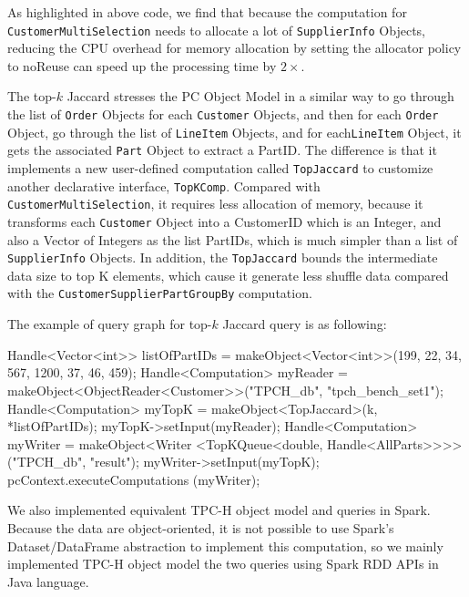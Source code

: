 As highlighted in above code,  we find
that because the computation for \texttt{CustomerMultiSelection} needs
to allocate a lot of \texttt{SupplierInfo} Objects, reducing the CPU
overhead for memory allocation by setting the allocator policy to
noReuse can speed up the processing time by $2\times$.

\vspace{5pt}
The top-$k$ Jaccard stresses the PC Object Model in a similar way to
go through the list of \texttt{Order} Objects for each
\texttt{Customer} Objects, and then for each \texttt{Order} Object, go
through the list of \texttt{LineItem} Objects, and for
each\texttt{LineItem} Object, it gets the associated \texttt{Part}
Object to extract a PartID. 
The difference is that it implements a new user-defined computation
called \texttt{TopJaccard} to customize another declarative interface,
\texttt{TopKComp}. Compared with \texttt{CustomerMultiSelection}, it
requires less allocation of memory, because it transforms each
\texttt{Customer} Object into a CustomerID which is an Integer, and
also a Vector of Integers as the list PartIDs, which is much simpler
than a list of  \texttt{SupplierInfo} Objects. In addition, the
\texttt{TopJaccard} bounds the intermediate data size to top K
elements, which cause it generate less shuffle data compared with the
\texttt{CustomerSupplierPartGroupBy} computation.

\vspace{5pt}
The example of query graph for top-$k$ Jaccard query is as following:

\begin{code}
    Handle<Vector<int>> listOfPartIDs = 
          makeObject<Vector<int>>(199, 22, 34, 567, 1200, 37, 46, 459);
    Handle<Computation> myReader = 
         makeObject<ObjectReader<Customer>>("TPCH_db", "tpch_bench_set1");
    Handle<Computation> myTopK = makeObject<TopJaccard>(k, *listOfPartIDs);
    myTopK->setInput(myReader);
    Handle<Computation> myWriter = makeObject<Writer
          <TopKQueue<double, Handle<AllParts>>>>("TPCH_db", "result");
    myWriter->setInput(myTopK);
    pcContext.executeComputations (myWriter);
\end{code}

We also implemented equivalent TPC-H object model and queries in Spark. Because the data are object-oriented, it
is not possible to use Spark's Dataset/DataFrame abstraction to
implement this computation, so we mainly implemented TPC-H object model the two queries
using Spark RDD APIs in Java language.



